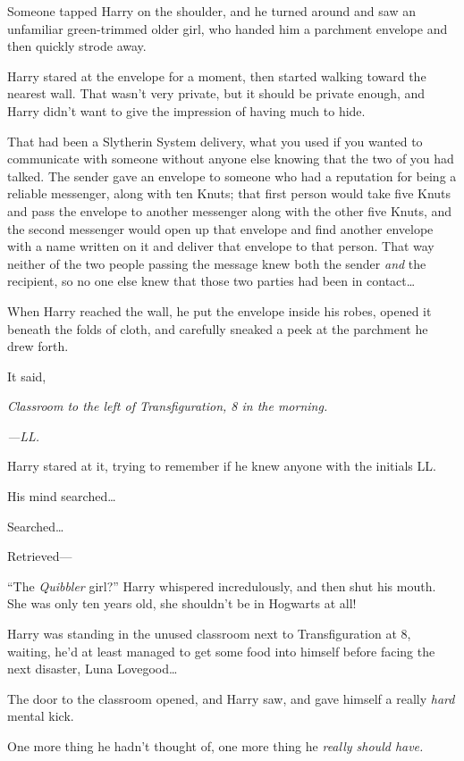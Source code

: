 Someone tapped Harry on the shoulder, and he turned around and saw an unfamiliar green-trimmed older girl, who handed him a parchment envelope and then quickly strode away.

Harry stared at the envelope for a moment, then started walking toward the nearest wall. That wasn’t very private, but it should be private enough, and Harry didn’t want to give the impression of having much to hide.

That had been a Slytherin System delivery, what you used if you wanted to communicate with someone without anyone else knowing that the two of you had talked. The sender gave an envelope to someone who had a reputation for being a reliable messenger, along with ten Knuts; that first person would take five Knuts and pass the envelope to another messenger along with the other five Knuts, and the second messenger would open up that envelope and find another envelope with a name written on it and deliver that envelope to that person. That way neither of the two people passing the message knew both the sender \emph{and} the recipient, so no one else knew that those two parties had been in contact…

When Harry reached the wall, he put the envelope inside his robes, opened it beneath the folds of cloth, and carefully sneaked a peek at the parchment he drew forth.

It said,

\emph{Classroom to the left of Transfiguration, 8 in the morning.}

\emph{—LL.}

Harry stared at it, trying to remember if he knew anyone with the initials LL.

His mind searched…

Searched…

Retrieved—

“The \emph{Quibbler} girl?” Harry whispered incredulously, and then shut his mouth. She was only ten years old, she shouldn’t be in Hogwarts at all!


Harry was standing in the unused classroom next to Transfiguration at 8\am, waiting, he’d at least managed to get some food into himself before facing the next disaster, Luna Lovegood…

The door to the classroom opened, and Harry saw, and gave himself a really \emph{hard} mental kick.

One more thing he hadn’t thought of, one more thing he \emph{really should have.}

